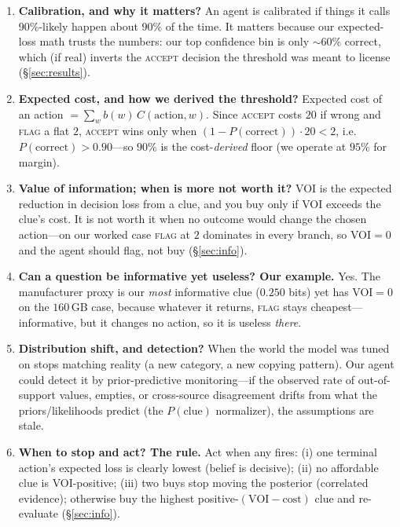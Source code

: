 \documentclass[11pt]{article}
\newcommand{\pcorrect}{P(\text{correct})}
\begin{document}
\begin{enumerate}[itemsep=3pt]
\item \textbf{Calibration, and why it matters?} An agent is calibrated if things it
calls 90\%-likely happen about 90\% of the time. It matters because our expected-loss
math trusts the numbers: our top confidence bin is only $\sim$60\% correct, which (if
real) inverts the \textsc{accept} decision the threshold was meant to license
(\S\ref{sec:results}).

\item \textbf{Expected cost, and how we derived the threshold?} Expected cost of an
action $=\sum_w b(w)\,C(\text{action},w)$. Since \textsc{accept} costs $20$ if wrong and
\textsc{flag} a flat $2$, \textsc{accept} wins only when $(1-\pcorrect)\cdot20<2$, i.e.\
$\pcorrect>0.90$---so $90\%$ is the cost-\emph{derived} floor (we operate at $95\%$ for
margin).

\item \textbf{Value of information; when is more not worth it?} VOI is the expected
reduction in decision loss from a clue, and you buy only if VOI exceeds the clue's cost.
It is not worth it when no outcome would change the chosen action---on our worked case
\textsc{flag} at $2$ dominates in every branch, so VOI$=0$ and the agent should flag,
not buy (\S\ref{sec:info}).

\item \textbf{Can a question be informative yet useless? Our example.} Yes. The
manufacturer proxy is our \emph{most} informative clue ($0.250$ bits) yet has VOI$=0$
on the $160$\,GB case, because whatever it returns, \textsc{flag} stays
cheapest---informative, but it changes no action, so it is useless \emph{there}.

\item \textbf{Distribution shift, and detection?} When the world the model was tuned on
stops matching reality (a new category, a new copying pattern). Our agent could detect
it by prior-predictive monitoring---if the observed rate of out-of-support values,
empties, or cross-source disagreement drifts from what the priors/likelihoods predict
(the $P(\text{clue})$ normalizer), the assumptions are stale.

\item \textbf{When to stop and act? The rule.} Act when any fires: (i) one terminal
action's expected loss is clearly lowest (belief is decisive); (ii) no affordable clue
is VOI-positive; (iii) two buys stop moving the posterior (correlated evidence);
otherwise buy the highest positive-$(\text{VOI}-\text{cost})$ clue and re-evaluate
(\S\ref{sec:info}).
\end{enumerate}



\end{document}
